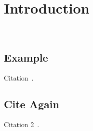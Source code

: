 
\chapter{Introduction}~\label{chp:intro}

\vspace{-4.3ex} %
\section{Example}

Citation~\cite{vaswani2017attention}.


\lipsum[1-10]


\section{Cite Again}

Citation 2~\cite{vaswani2017attention}.
